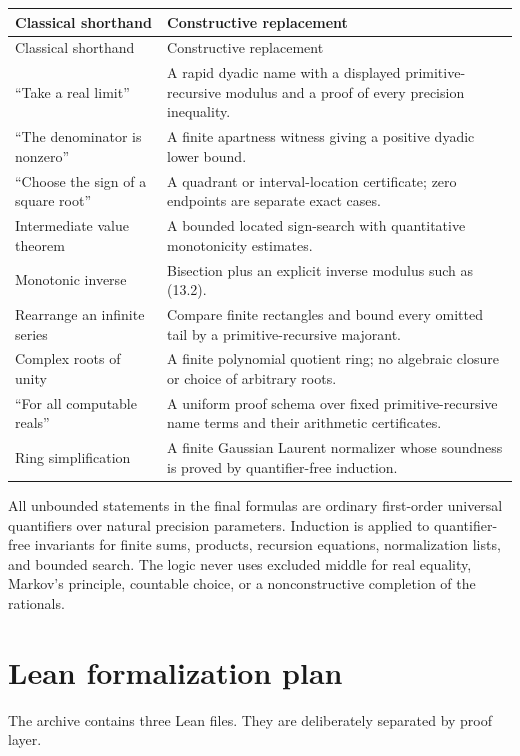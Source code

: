 \documentclass[11pt]{article}
\theoremstyle{definition}
\begin{document}
\begin{longtable}{@{}p{}p{}@{}}
\toprule
Classical shorthand & Constructive replacement\\
\midrule
\endfirsthead
\toprule
Classical shorthand & Constructive replacement\\
\midrule
\endhead
``Take a real limit'' & A rapid dyadic name with a displayed primitive-recursive
modulus and a proof of every precision inequality.\\
``The denominator is nonzero'' & A finite apartness witness giving a positive
dyadic lower bound.\\
``Choose the sign of a square root'' & A quadrant or interval-location
certificate; zero endpoints are separate exact cases.\\
Intermediate value theorem & A bounded located sign-search with quantitative
monotonicity estimates.\\
Monotonic inverse & Bisection plus an explicit inverse modulus such as (13.2).\\
Rearrange an infinite series & Compare finite rectangles and bound every omitted
tail by a primitive-recursive majorant.\\
Complex roots of unity & A finite polynomial quotient ring; no algebraic closure
or choice of arbitrary roots.\\
``For all computable reals'' & A uniform proof schema over fixed
primitive-recursive name terms and their arithmetic certificates.\\
Ring simplification & A finite Gaussian Laurent normalizer whose soundness is
proved by quantifier-free induction.\\
\bottomrule
\end{longtable}

All unbounded statements in the final formulas are ordinary first-order
universal quantifiers over natural precision parameters.  Induction is applied
to quantifier-free invariants for finite sums, products, recursion equations,
normalization lists, and bounded search.  The logic never uses excluded middle
for real equality, Markov's principle, countable choice, or a nonconstructive
completion of the rationals.

\section{Lean formalization plan}
\label{sec:lean}

The archive contains three Lean files.  They are deliberately separated by
proof layer.
\end{document}
